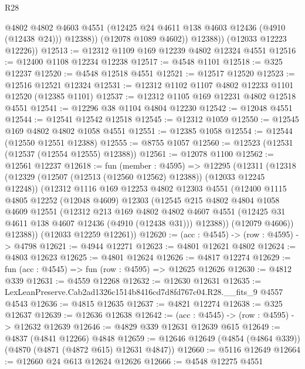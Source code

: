\begin{lexlean}{R28}
\begin{coremodule}
                @4802
                @4802
                @4603
                @4551
                (@12425 @24 @4611 @138 @4603 @12436 (@4910 (@12438 @24)))
                @12388))
            (@12078 @1089 @4602))
          @12388))
      (@12033 @12223 @12226))
@12513 := @12312 @1109 @169 @12239 @4802 @12324 @4551
@12516 := @12400 @1108 @12234 @12238
@12517 := @4548 @1101
@12518 := @325 @12237
@12520 := @4548 @12518 @4551
@12521 := @12517 @12520
@12523 := @12516 @12521 @12324
@12531 := @12312 @1102 @1107 @4802 @12233 @1101 @12520 (@12385 @1101)
@12537 := @12312 @1105 @169 @12231 @4802 @12518 @4551
@12541 := @12296 @38 @1104 @4804 @12230
@12542 := @12048 @4551
@12544 := @12541 @12542 @12518
@12545 := @12312 @1059
@12550 := @12545 @169 @4802 @4802 @1058 @4551
@12551 := @12385 @1058
@12554 := @12544 (@12550 @12551 @12388)
@12555 := @8755 @1057
@12560 := @12523 (@12531 (@12537 (@12554 @12555) @12388))
@12561 := @12078 @1100
@12562 := @12561 @12237
@12618 := fun (member : @4595) =>
  @12295
    (@12311
      (@12318
        (@12329 (@12507 (@12513 (@12560 @12562) @12388)) (@12033 @12245 @12248))
        (@12312
          @1116
          @169
          @12253
          @4802
          @12303
          @4551
          (@12400
            @1115
            @4805
            @12252
            (@12048 @4609)
            @12303
            (@12545
              @215
              @4802
              @4804
              @1058
              @4609
              @12551
              (@12312
                @213
                @169
                @4802
                @4802
                @4607
                @4551
                (@12425 @31 @4611 @138 @4607 @12436 (@4910 (@12438 @31)))
                @12388))
            (@12079 @4606))
          @12388))
      (@12033 @12259 @12261))
@12620 := (acc : @4545) -> (row : @4595) -> @4798
@12621 := @4944 @12271
@12623 := @4801 @12621 @4802
@12624 := @4803 @12623
@12625 := @4801 @12624
@12626 := @4817 @12274
@12629 := fun (acc : @4545) => fun (row : @4595) => @12625 @12626
@12630 := @4812 @339
@12631 := @4559 @12268
@12632 := @12630 @12631
@12635 := LexLeanPreserve.Cab2ad1326c1514b8416cd7d8fd767c04.R28.__fits_9 @4557 @4543
@12636 := @4815 @12635
@12637 := @4821 @12274
@12638 := @325 @12637
@12639 := @12636 @12638
@12642 := (acc : @4545) -> (row : @4595) -> @12632 @12639
@12646 := @4829 @339 @12631 @12639 @615
@12649 := @4837 (@4841 @12266) @4848
@12659 := @12646 @12649 (@4854 (@4864 @339)) (@4870 (@4871 (@4872 @615) @12631 @4847))
@12660 := @5116 @12649
@12664 := @12660 @24 @613 @12624 @12626
@12666 := @4548 @12275 @4551

\end{coremodule}
\end{lexlean}
